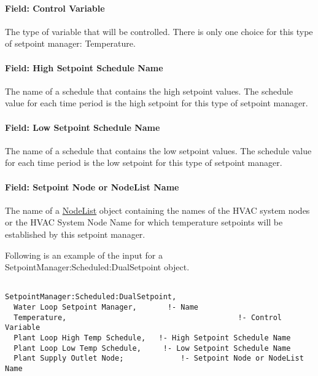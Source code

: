 \paragraph{Field: Control Variable}\label{field-control-variable-1}

The type of variable that will be controlled. There is only one choice for this type of setpoint manager: Temperature.

\paragraph{Field: High Setpoint Schedule Name}\label{field-high-setpoint-schedule-name}

The name of a schedule that contains the high setpoint values. The schedule value for each time period is the high setpoint for this type of setpoint manager.

\paragraph{Field: Low Setpoint Schedule Name}\label{field-low-setpoint-schedule-name}

The name of a schedule that contains the low setpoint values. The schedule value for each time period is the low setpoint for this type of setpoint manager.

\paragraph{Field: Setpoint Node or NodeList Name}\label{field-setpoint-node-or-nodelist-name-1}

The name of a \hyperref[nodelist]{NodeList} object containing the names of the HVAC system nodes or the HVAC System Node Name for which temperature setpoints will be established by this setpoint manager.

Following is an example of the input for a SetpointManager:Scheduled:DualSetpoint object.

\begin{lstlisting}

SetpointManager:Scheduled:DualSetpoint,
  Water Loop Setpoint Manager,       !- Name
  Temperature,                                       !- Control Variable
  Plant Loop High Temp Schedule,   !- High Setpoint Schedule Name
  Plant Loop Low Temp Schedule,     !- Low Setpoint Schedule Name
  Plant Supply Outlet Node;             !- Setpoint Node or NodeList Name
\end{lstlisting}

